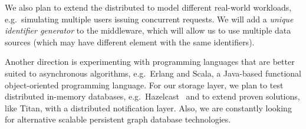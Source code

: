 We also plan to extend the distributed \tb{} to model different real-world workloads, e.g.\ simulating multiple users issuing concurrent requests. We will add a \emph{unique identifier generator} to the middleware, which will allow us to use multiple data sources (which may have different element with the same identifiers).   

Another direction is experimenting with programming languages that are better suited to asynchronous algorithms, e.g.\ Erlang and Scala, a Java-based functional object-oriented programming language.
For our storage layer, we plan to test distributed in-memory databases, e.g.\ Hazelcast~\cite{Hazelcast} and to extend proven solutions, like Titan, with a distributed notification layer.
Also, we are constantly looking for alternative scalable persistent graph database technologies. 
